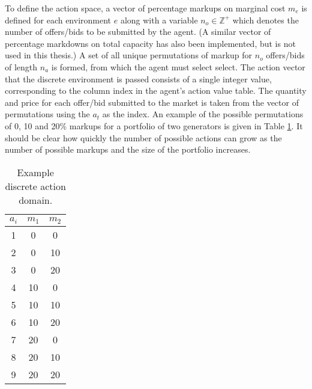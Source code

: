 To define the action space, a vector of percentage markups on marginal cost
$m_e$ is defined for each environment $e$ along with a variable $n_o \in
\mathbb{Z}^+$ which denotes the number of offers/bids to be submitted by the
agent.  (A similar vector of percentage markdowns on total capacity has also
been implemented, but is not used in this thesis.)  A set of all unique
permutations of markup for $n_o$ offers/bids of length $n_a$ is formed, from
which the agent must select select.  The action vector that the discrete
environment is passed consists of a single integer value, corresponding to the
column index in the agent's action value table.  The quantity and price for
each offer/bid submitted to the market is taken from the vector of
permutations using the $a_t$ as the index.  An example of the possible
permutations of 0, 10 and 20\% markups for a portfolio of two generators is
given in Table \ref{tbl:example_actions}.  It should be clear how quickly the
number of possible actions can grow as the number of possible markups and the
size of the portfolio increases.

\begin{table}
\begin{center}
\begin{tabular}{c|c|c}
\hline
$a_i$ &$m_1$ &$m_2$ \\
\hline\hline
 1 &0 &0 \\
 2 &0 &10 \\
 3 &0 &20 \\
 4 &10 &0 \\
 5 &10 &10 \\
 6 &10 &20 \\
 7 &20 &0 \\
 8 &20 &10 \\
 9 &20 &20 \\
\hline
\end{tabular}
\caption{Example discrete action domain.}
\label{tbl:example_actions}
\end{center}
\end{table}

